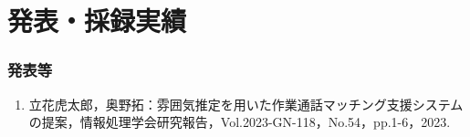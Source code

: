 \chapter*{発表・採録実績}


\subsection*{発表等}
\begin{enumerate}
\renewcommand{\labelenumi}{[\arabic{enumi}]}
    \item 立花虎太郎，奥野拓：雰囲気推定を用いた作業通話マッチング支援システムの提案，情報処理学会研究報告，Vol.2023-GN-118，No.54，pp.1-6，2023.
\end{enumerate}
